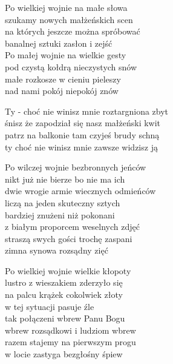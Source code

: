 \begin{text}
    Po wielkiej wojnie na małe słowa\\
    szukamy nowych małżeńskich scen\\
    na których jeszcze można spróbować\\
    banalnej sztuki zasłon i zejść\\
    Po małej wojnie na wielkie gesty\\
    pod czystą kołdrą nieczystych snów\\
    małe rozkosze w cieniu pieleszy\\
    nad nami pokój niepokój znów

    Ty - choć nie winisz mnie roztargniona zbyt\\
    śnisz że zapodział się nasz małżeński kwit\\
    patrz na balkonie tam czyjeś brudy schną\\
    ty choć nie winisz mnie zawsze widzisz ją

    Po wilczej wojnie bezbronnych jeńców\\
    nikt już nie bierze bo nie ma ich\\
    dwie wrogie armie wiecznych odmieńców\\
    liczą na jeden skuteczny sztych\\
    bardziej znużeni niż pokonani\\
    z białym proporcem weselnych zdjęć\\
    straszą swych gości trochę zaspani\\
    zimna synowa rozsądny zięć

    Po wielkiej wojnie wielkie kłopoty\\
    lustro z wieszakiem zderzyło się\\
    na palcu krążek cokolwiek złoty\\
    w tej sytuacji pasuje źle\\
    tak połączeni wbrew Panu Bogu\\
    wbrew rozsądkowi i ludziom wbrew\\
    razem stajemy na pierwszym progu\\
    w locie zastyga bezgłośny śpiew
\end{text}
\begin{chord}

\end{chord}